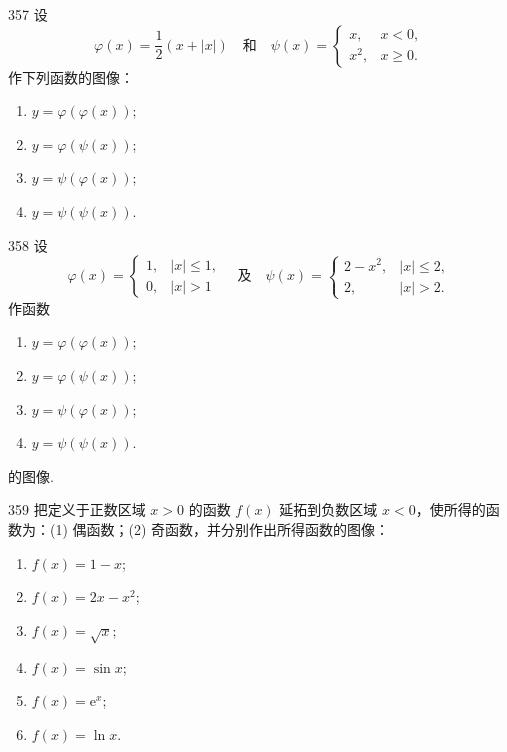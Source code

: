 \begin{prob}[L]{357}
设
\[
\varphi(x) = \frac{1}{2}(x + |x|) \quad \text{和} \quad \psi(x) = \begin{cases}
x, & x < 0, \\
x^2, & x \geqslant 0.
\end{cases}
\]
作下列函数的图像：
\begin{enumerate}[label=(\alph*), itemsep=2pt, topsep=3pt]
  \item $y = \varphi(\varphi(x))$;
  \item $y = \varphi(\psi(x))$;
  \item $y = \psi(\varphi(x))$;
  \item $y = \psi(\psi(x))$.
\end{enumerate}
\end{prob}

\begin{prob}[L]{358}
设
\[
\varphi(x) = \begin{cases}
1, & |x| \leqslant 1, \\
0, & |x| > 1
\end{cases} \quad \text{及} \quad \psi(x) = \begin{cases}
2 - x^2, & |x| \leqslant 2, \\
2, & |x| > 2.
\end{cases}
\]
作函数
\begin{enumerate}[label=(\alph*), itemsep=2pt, topsep=3pt]
  \item $y = \varphi(\varphi(x))$;
  \item $y = \varphi(\psi(x))$;
  \item $y = \psi(\varphi(x))$;
  \item $y = \psi(\psi(x))$.
\end{enumerate}
的图像.
\end{prob}

\begin{prob}[L]{359}
把定义于正数区域 $x > 0$ 的函数 $f(x)$ 延拓到负数区域 $x < 0$，使所得的函数为：(1) 偶函数；(2) 奇函数，并分别作出所得函数的图像：
\begin{enumerate}[label=(\alph*), itemsep=2pt, topsep=3pt]
  \item $f(x) = 1 - x$;
  \item $f(x) = 2x - x^2$;
  \item $f(x) = \sqrt{x}$;
  \item $f(x) = \sin x$;
  \item $f(x) = \mathrm{e}^x$;
  \item $f(x) = \ln x$.
\end{enumerate}
\end{prob}

